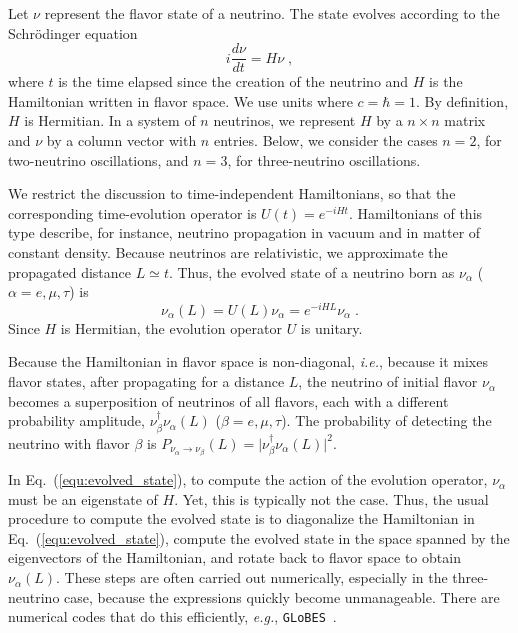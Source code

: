 \documentclass[final,5p,times,twocolumn]{elsarticle}
\newcommand{\ie}{{\it i.e.}}
\newcommand{\eg}{{\it e.g.}}
\newcommand{\eq}{Eq.}
\newcommand{\equ}[1]{\eq~(\ref{equ:#1})}
\begin{document}
Let $\nu$ represent the flavor state of a neutrino.  The state evolves according to the Schr\"odinger equation
\begin{equation}
 \label{equ:evolution_eq}
 i \frac{d\nu}{dt} = H \nu \;,
\end{equation}
where $t$ is the time elapsed since the creation of the neutrino and $H$ is the Hamiltonian written in flavor space.  We use units where $c = \hbar = 1$.  By definition, $H$ is Hermitian.  In a system of $n$ neutrinos, we represent $H$ by a $n \times n$ matrix and $\nu$ by a column vector with $n$ entries.  Below, we consider the cases $n=2$, for two-neutrino oscillations, and $n=3$, for three-neutrino oscillations. 

We restrict the discussion to time-independent Hamiltonians, so that the corresponding time-evolution operator is $U\left(t\right) = e^{-iHt}$.  Hamiltonians of this type describe, for instance, neutrino propagation in vacuum and in matter of constant density.  Because neutrinos are relativistic, we approximate the propagated distance $L \simeq t$.   Thus, the evolved state of a neutrino born as $\nu_\alpha$ ($\alpha = e, \mu, \tau$) is
\begin{equation}
 \label{equ:evolved_state}
 \nu_\alpha\left(L\right) 
 = U(L) \nu_\alpha
 = e^{-iHL} \nu_\alpha \;.
\end{equation}
Since $H$ is Hermitian, the evolution operator $U$ is unitary.

Because the Hamiltonian in flavor space is non-diagonal, \ie, because it mixes flavor states, after propagating for a distance $L$, the neutrino of initial flavor $\nu_\alpha$ becomes a superposition of neutrinos of all flavors, each with a different probability amplitude, $\nu_\beta^\dagger \nu_\alpha(L)$ ($\beta = e, \mu, \tau$).  The probability of detecting the neutrino with flavor $\beta$ is $P_{\nu_\alpha \to \nu_\beta}(L) = \lvert \nu_\beta^\dagger \nu_\alpha(L) \rvert^2$.

In \equ{evolved_state}, to compute the action of the evolution operator, $\nu_\alpha$ must be an eigenstate of $H$.  Yet, this is typically not the case.  Thus, the usual procedure to compute the evolved state is to diagonalize the Hamiltonian in \equ{evolved_state}, compute the evolved state in the space spanned by the eigenvectors of the Hamiltonian, and rotate back to flavor space to obtain $\nu_\alpha(L)$.  These steps are often carried out numerically, especially in the three-neutrino case, because the expressions quickly become unmanageable.  There are numerical codes that do this efficiently, \eg, {\tt GLoBES}\ \cite{GLoBES, Kopp:2006wp, Huber:2007ji}.
\end{document}
